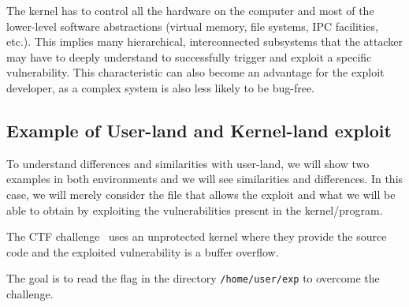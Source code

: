 \documentclass{masterthesis}
\begin{document}
The kernel has to control all the hardware on the computer and most of the lower-level software abstractions (virtual memory, file systems, IPC facilities, etc.). This implies many hierarchical, interconnected subsystems that the attacker may have to deeply understand to successfully trigger and exploit a specific vulnerability. This characteristic can also become an advantage for the exploit developer, as a complex system is also less likely to be bug-free.

\subsection{Example of User-land and Kernel-land exploit}
\label{subsect:example_of_kernel_user_land}

To understand differences and similarities with user-land, we will show two examples in both environments and we will see similarities and differences. In this case, we will merely consider the file that allows the exploit and what we will be able to obtain by exploiting the vulnerabilities present in the kernel/program.

The CTF challenge~\cite{m0leconTeaser2020_babyk} uses an unprotected kernel where they provide the source code and the exploited vulnerability is a buffer overflow.

The goal is to read the flag in the directory \texttt{/home/user/exp} to overcome the challenge.
\end{document}
